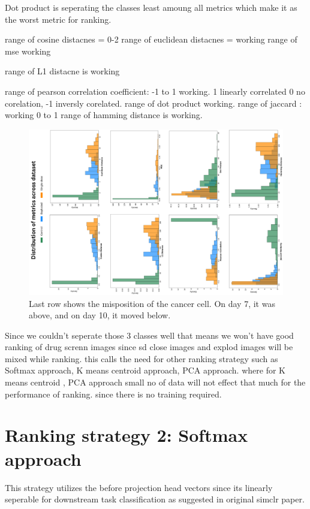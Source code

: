 Dot product is seperating the classes least amoung all metrics which make it as the worst metric for ranking.


range of cosine distacnes = 0-2
range of euclidean distacnes = working
range of mse working

range of L1 distacne is working

range of pearson correlation coefficient: -1 to 1 working. 1 linearly correlated 0 no corelation, -1 inversly corelated.
range of dot product  working.
range of jaccard : working 0 to 1
range of hamming distance is working.


\begin{figure}[H]
  \centering
  \includegraphics[scale=0.5, angle=270]{figures/predall.pdf} 
  \caption{Last row shows the misposition of the cancer cell. On day 7, it was above, and on day 10, it moved below.}
  \label{fig:bargraph}
\end{figure}


Since we couldn't seperate those 3 classes well that means we won't have good ranking of drug screnn images since sd close images and explod images will be mixed while ranking. this calls the need for other ranking strategy such as Softmax approach, K means centroid approach, PCA approach. where for K means centroid , PCA approach small no of data will not effect that much for the performance of ranking. since there is no training required.

\section{Ranking strategy 2: Softmax approach}

This strategy utilizes the before projection head vectors since its linearly seperable for downstream task classification as suggested in original simclr paper.

